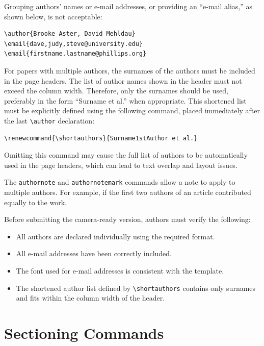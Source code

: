 \documentclass[sigconf]{acmart}
\begin{document}
Grouping authors' names or e-mail addresses, or providing an ``e-mail
alias,'' as shown below, is not acceptable:
\begin{verbatim}
\author{Brooke Aster, David Mehldau}
\email{dave,judy,steve@university.edu}
\email{firstname.lastname@phillips.org}
\end{verbatim}

For papers with multiple authors, the surnames of the authors must be included in the page headers. The list of author names shown in the header must not exceed the column width. Therefore, only the surnames should be used, preferably in the form ``Surname et al.'' when appropriate. This shortened list must be explicitly defined using the following command, placed immediately after the last \verb|\author| declaration:

\begin{verbatim}
\renewcommand{\shortauthors}{Surname1stAuthor et al.}
\end{verbatim}

Omitting this command may cause the full list of authors to be automatically used in the page headers, which can lead to text overlap and layout issues.

The \verb|authornote| and \verb|authornotemark| commands allow a note
to apply to multiple authors. For example, if the first two authors
of an article contributed equally to the work.

Before submitting the camera-ready version, authors must verify the following:
\begin{itemize}
  \item All authors are declared individually using the required format.
  \item All e-mail addresses have been correctly included.
  \item The font used for e-mail addresses is consistent with the template.
  \item The shortened author list defined by \verb|\shortauthors| contains only surnames and fits within the column width of the header.
\end{itemize}

\section{Sectioning Commands}
\end{document}
